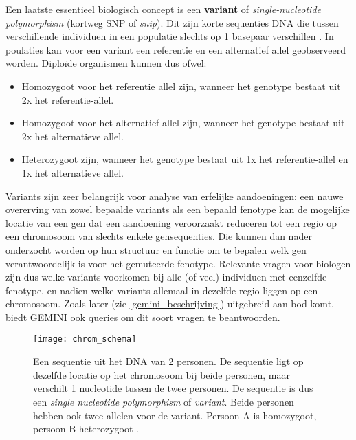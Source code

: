 Een laatste essentieel biologisch concept is een \textbf{variant} of \textit{single-nucleotide polymorphism} (kortweg SNP of \textit{snip}). Dit zijn korte sequenties DNA die tussen verschillende individuen in een populatie slechts op 1 basepaar verschillen \cite{alberts2007molecular}. In poulaties kan voor een variant een referentie en een alternatief allel geobserveerd worden. Diplo\"ide organismen kunnen dus ofwel:
\begin{itemize}
\item Homozygoot voor het referentie allel zijn, wanneer het genotype bestaat uit 2x het referentie-allel.
\item Homozygoot voor het alternatief allel zijn, wanneer het genotype bestaat uit 2x het alternatieve allel.
\item Heterozygoot zijn, wanneer het genotype bestaat uit 1x het referentie-allel en 1x het alternatieve allel.
\end{itemize}
Variants zijn zeer belangrijk voor analyse van erfelijke aandoeningen: een nauwe overerving van zowel bepaalde variants als een bepaald fenotype kan de mogelijke locatie van een gen dat een aandoening veroorzaakt reduceren tot een regio op een chromosoom van slechts enkele gensequenties. Die kunnen dan nader onderzocht worden op hun structuur en functie om te bepalen welk gen verantwoordelijk is voor het gemuteerde fenotype. Relevante vragen voor biologen zijn dus welke variants voorkomen bij alle (of veel) individuen met eenzelfde fenotype, en nadien welke variants allemaal in dezelfde regio liggen op een chromosoom. Zoals later (zie \ref{gemini_beschrijving}) uitgebreid aan bod komt, biedt GEMINI ook queries om dit soort vragen te beantwoorden.\\

\begin{figure}[!h]
\texttt{[image: chrom\_schema]}
\caption{Een sequentie uit het DNA van 2 personen. De sequentie ligt op dezelfde locatie op het chromosoom bij beide personen, maar verschilt 1 nucleotide tussen de twee personen. De sequentie is dus een \textit{single nucleotide polymorphism} of \textit{variant}. Beide personen hebben ook twee allelen voor de variant. Persoon A is homozygoot, persoon B heterozygoot \cite{chrom_clipart}.}
\label{chrom_schema}
\end{figure}


